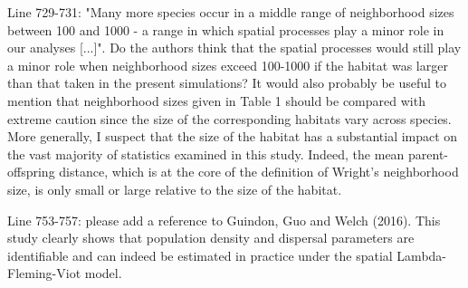 
\begin{point}{}
    Line 729-731: "Many more species occur in a middle range of neighborhood sizes between 100 and 1000 - a range in which spatial processes play a minor role in our analyses [...]". Do the authors think that the spatial processes would still play a minor role when neighborhood sizes exceed 100-1000 if the habitat was larger than that taken in the present simulations? It would also probably be useful to mention that neighborhood sizes given in Table 1 should be compared with extreme caution since the size of the corresponding habitats vary across species. More generally, I suspect that the size of the habitat has a substantial impact on the vast majority of statistics examined in this study. Indeed, the mean parent-offspring distance, which is at the core of the definition of Wright's neighborhood size, is only small or large relative to the size of the habitat.
\end{point}


\begin{point}{}
    Line 753-757: please add a reference to Guindon, Guo and Welch (2016). This study clearly shows that population density and dispersal parameters are identifiable and can indeed be estimated in practice under the spatial Lambda-Fleming-Viot model.
\end{point}





